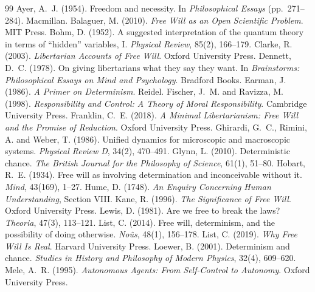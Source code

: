 \documentclass{situationist-preprint}
\begin{document}
\begin{thebibliography}{99}\small
{} Ayer, A.~J. (1954). Freedom and necessity. In \emph{Philosophical Essays} (pp.~271--284). Macmillan.
 Balaguer, M. (2010). \emph{Free Will as an Open Scientific Problem}. MIT Press.
 Bohm, D. (1952). A suggested interpretation of the quantum theory in terms of \enquote{hidden} variables, I. \emph{Physical Review}, 85(2), 166--179.
 Clarke, R. (2003). \emph{Libertarian Accounts of Free Will}. Oxford University Press.
 Dennett, D.~C. (1978). On giving libertarians what they say they want. In \emph{Brainstorms: Philosophical Essays on Mind and Psychology}. Bradford Books.
 Earman, J. (1986). \emph{A Primer on Determinism}. Reidel.
 Fischer, J.~M. and Ravizza, M. (1998). \emph{Responsibility and Control: A Theory of Moral Responsibility}. Cambridge University Press.
 Franklin, C.~E. (2018). \emph{A Minimal Libertarianism: Free Will and the Promise of Reduction}. Oxford University Press.
 Ghirardi, G.~C., Rimini, A. and Weber, T. (1986). Unified dynamics for microscopic and macroscopic systems. \emph{Physical Review D}, 34(2), 470--491.
 Glynn, L. (2010). Deterministic chance. \emph{The British Journal for the Philosophy of Science}, 61(1), 51--80.
 Hobart, R.~E. (1934). Free will as involving determination and inconceivable without it. \emph{Mind}, 43(169), 1--27.
 Hume, D. (1748). \emph{An Enquiry Concerning Human Understanding}, Section VIII.
 Kane, R. (1996). \emph{The Significance of Free Will}. Oxford University Press.
 Lewis, D. (1981). Are we free to break the laws? \emph{Theoria}, 47(3), 113--121.
 List, C. (2014). Free will, determinism, and the possibility of doing otherwise. \emph{No\^us}, 48(1), 156--178.
 List, C. (2019). \emph{Why Free Will Is Real}. Harvard University Press.
 Loewer, B. (2001). Determinism and chance. \emph{Studies in History and Philosophy of Modern Physics}, 32(4), 609--620.
 Mele, A.~R. (1995). \emph{Autonomous Agents: From Self-Control to Autonomy}. Oxford University Press.

\end{thebibliography}
\end{document}
